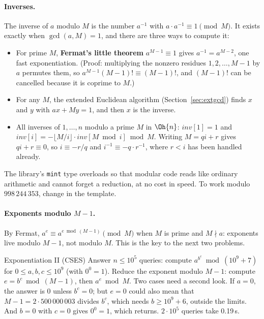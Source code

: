 \paragraph{Inverses.} The inverse of $a$ modulo $M$ is the number $a^{-1}$ with $a \cdot a^{-1} \equiv 1 \pmod M$. It exists exactly when
$\gcd(a, M) = 1$, and there are three ways to compute it:
\begin{itemize}
  \item For prime $M$, \textbf{Fermat's little theorem} $a^{M-1} \equiv 1$ gives $a^{-1} = a^{M-2}$, one fast exponentiation. (Proof:
        multiplying the nonzero residues $1, 2, \dots, M - 1$ by $a$ permutes them, so $a^{M-1} (M-1)! \equiv (M-1)!$, and $(M-1)!$
        can be cancelled because it is coprime to $M$.)
  \item For any $M$, the extended Euclidean algorithm (Section~\ref{sec:extgcd}) finds $x$ and $y$ with $ax + My = 1$, and then $x$ is
        the inverse.
  \item All inverses of $1, \dots, n$ modulo a prime $M$ in $\Oh{n}$: $\mathit{inv}[1] = 1$ and $\mathit{inv}[i] = -\lfloor M/i \rfloor
        \cdot \mathit{inv}[M \bmod i] \bmod M$. Writing $M = qi + r$ gives $qi + r \equiv 0$, so $i \equiv -r/q$ and $i^{-1} \equiv
        -q \cdot r^{-1}$, where $r < i$ has been handled already.
\end{itemize}


\begin{trick}
The library's \texttt{mint} type overloads \cc{+ - * /} so that modular code reads like ordinary arithmetic and cannot forget a
reduction, at no cost in speed. To work modulo $998\,244\,353$, change  in the template.
\end{trick}

\paragraph{Exponents modulo $M - 1$.} By Fermat, $a^{e} \equiv a^{e \bmod (M - 1)} \pmod M$ when $M$ is prime and $M \nmid a$:
exponents live modulo $M - 1$, not modulo $M$. This is the key to the next two problems.

\begin{problem}{Exponentiation II (CSES)}
Answer $n \le 10^5$ queries: compute $a^{b^c} \bmod (10^9 + 7)$ for $0 \le a, b, c \le 10^9$ (with $0^0 = 1$).
\solution Reduce the exponent modulo $M - 1$: compute $e = b^c \bmod (M - 1)$, then $a^e \bmod M$. Two cases need a second look. If
$a = 0$, the answer is 0 unless $b^c = 0$; but $e = 0$ could also mean that $M - 1 = 2 \cdot 500\,000\,003$ divides $b^c$, which needs
$b \ge 10^9 + 6$, outside the limits. And $b = 0$ with $c = 0$ gives $0^0 = 1$, which  returns. $2 \cdot 10^5$ queries
take 0.19\,s.
\end{problem}

